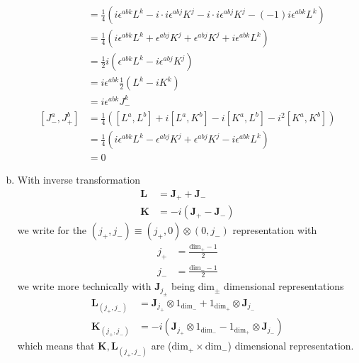 \documentclass[../main.tex]{subfiles}
\begin{document}
\begin{enumerate}[(a)]
\begin{align}
&=\frac{1}{4}\left(i\epsilon^{abk}L^k-i\cdot i\epsilon^{abj}K^j-i\cdot i\epsilon^{abj}K^j-(-1)i\epsilon^{abk}L^k\right)\\
&=\frac{1}{4}\left(i\epsilon^{abk}L^k+\epsilon^{abj}K^j+\epsilon^{abj}K^j+i\epsilon^{abk}L^k\right)\\
&=\frac{1}{2}i\left(\epsilon^{abk}L^k-i\epsilon^{abj}K^j\right)\\
&=i\epsilon^{abk}\frac{1}{2}\left(L^k-iK^k\right)\\
&=i\epsilon^{abk}J_{-}^k\\
[J_-^a,J_+^b]&=\frac{1}{4}\left([L^a,L^b]+i[L^a,K^b]-i[K^a,L^b]-i^2[K^a,K^b]\right)\\
&=\frac{1}{4}\left(i\epsilon^{abk}L^k-\epsilon^{abj}K^j+\epsilon^{abj}K^j-i\epsilon^{abk}L^k\right)\\
&=0
\end{align}

\item With inverse transformation
\begin{align}
\mathbf{L}&=\mathbf{J}_++\mathbf{J}_-\\
\mathbf{K}&=-i(\mathbf{J}_+-\mathbf{J}_-)
\end{align}
we write for the $(j_+,j_-)\equiv(j_+,0)\otimes(0,j_-)$ representation with
\begin{align}
j_+&=\frac{\text{dim}_+-1}{2}\\
j_-&=\frac{\text{dim}_--1}{2}
\end{align}
we write more technically with $\mathbf{J}_{j_\pm}$ being $\text{dim}_{\pm}$ dimensional representations
\begin{align}
\mathbf{L}_{(j_+,j_-)}
&=\mathbf{J}_{j_+}\otimes1_{\text{dim}_-}+1_{\text{dim}_+}\otimes\mathbf{J}_{j_-}\\
\mathbf{K}_{(j_+,j_-)}
&=-i(\mathbf{J}_{j_+}\otimes1_{\text{dim}_-}-1_{\text{dim}_+}\otimes\mathbf{J}_{j_-})
\end{align}
which means that $\mathbf{K,L}_{(j_+,j_-)}$ are ($\text{dim}_+\times\text{dim}_-$) dimensional representation.


\end{enumerate}
\end{document}
